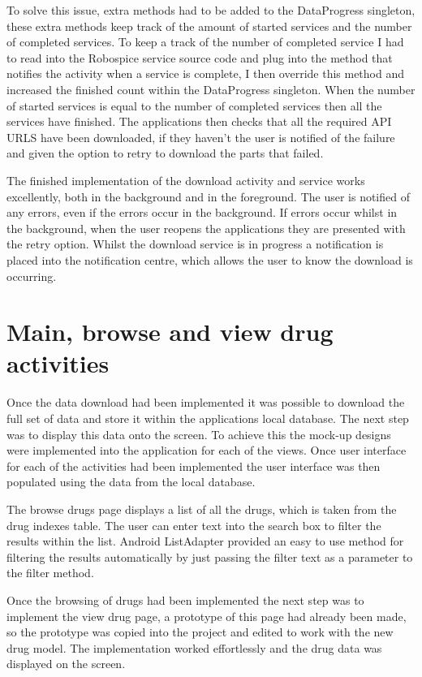 To solve this issue, extra methods had to be added to the DataProgress singleton, these extra methods keep track of the amount of started services and the number of completed services. To keep a track of the number of completed service I had to read into the Robospice service source code \cite{robospice} and plug into the method that notifies the activity when a service is complete, I then override this method and increased the finished count within the DataProgress singleton. When the number of started services is equal to the number of completed services then all the services have finished. The applications then checks that all the required API URLS have been downloaded, if they haven't the user is notified of the failure and given the option to retry to download the parts that failed. 

The finished implementation of the download activity and service works excellently, both in the background and in the foreground. The user is notified of any errors, even if the errors occur in the background. If errors occur whilst in the background, when the user reopens the applications they are presented with the retry option. Whilst the download service is in progress a notification is placed into the notification centre, which allows the user to know the download is occurring.


\section{Main, browse and view drug activities}

Once the data download had been implemented it was possible to download the full set of data and store it within the applications local database. The next step was to display this data onto the screen. To achieve this the mock-up designs were implemented into the application for each of the views. Once user interface for each of the activities had been implemented the user interface was then populated using the data from the local database. 

The browse drugs page displays a list of all the drugs, which is taken from the drug indexes table. The user can enter text into the search box to filter the results within the list. Android ListAdapter provided an easy to use method for filtering the results automatically by just passing the filter text as a parameter to the filter method. 

Once the browsing of drugs had been implemented the next step was to implement the view drug page, a prototype of this page had already been made, so the prototype was copied into the project and edited to work with the new drug model. The implementation worked effortlessly and the drug data was displayed on the screen. 

